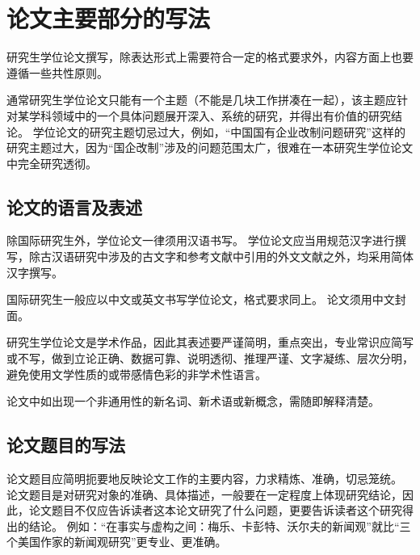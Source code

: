 

\chapter{论文主要部分的写法}

研究生学位论文撰写，除表达形式上需要符合一定的格式要求外，内容方面上也要遵循一些共性原则。

通常研究生学位论文只能有一个主题（不能是几块工作拼凑在一起），该主题应针对某学科领域中的一个具体问题展开深入、系统的研究，并得出有价值的研究结论。
学位论文的研究主题切忌过大，例如，“中国国有企业改制问题研究”这样的研究主题过大，因为“国企改制”涉及的问题范围太广，很难在一本研究生学位论文中完全研究透彻。



\section{论文的语言及表述}

除国际研究生外，学位论文一律须用汉语书写。
学位论文应当用规范汉字进行撰写，除古汉语研究中涉及的古文字和参考文献中引用的外文文献之外，均采用简体汉字撰写。

国际研究生一般应以中文或英文书写学位论文，格式要求同上。
论文须用中文封面。

研究生学位论文是学术作品，因此其表述要严谨简明，重点突出，专业常识应简写或不写，做到立论正确、数据可靠、说明透彻、推理严谨、文字凝练、层次分明，避免使用文学性质的或带感情色彩的非学术性语言。

论文中如出现一个非通用性的新名词、新术语或新概念，需随即解释清楚。



\section{论文题目的写法}

论文题目应简明扼要地反映论文工作的主要内容，力求精炼、准确，切忌笼统。
论文题目是对研究对象的准确、具体描述，一般要在一定程度上体现研究结论，因此，论文题目不仅应告诉读者这本论文研究了什么问题，更要告诉读者这个研究得出的结论。
例如：“在事实与虚构之间：梅乐、卡彭特、沃尔夫的新闻观”就比“三个美国作家的新闻观研究”更专业、更准确。



